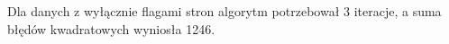 \documentclass{classrep}
\begin{document}
    

    Dla danych z wyłącznie flagami stron algorytm potrzebował 3 iteracje, a suma błędów kwadratowych wyniosła 1246.
    
\end{document}
